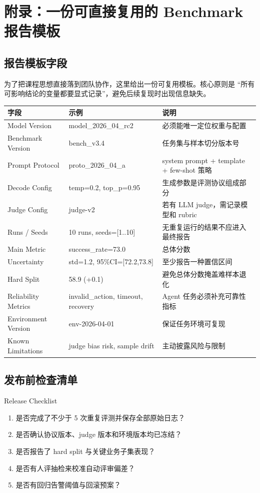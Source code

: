 \section{附录：一份可直接复用的 Benchmark 报告模板}

\subsection{报告模板字段}
为了把课程思想直接落到团队协作，这里给出一份可复用模板。核心原则是 ``所有可影响结论的变量都要显式记录''，避免后续复现时出现信息缺失。

\begin{longtable}{p{2.9cm}p{3.7cm}p{4.5cm}}
\toprule
\textbf{字段} & \textbf{示例} & \textbf{说明} \\
\midrule
Model Version & model\_2026\_04\_rc2 & 必须能唯一定位权重与配置 \\
Benchmark Version & bench\_v3.4 & 任务集与样本切分版本号 \\
Prompt Protocol & proto\_2026\_04\_a & system prompt + template + few-shot 策略 \\
Decode Config & temp=0.2, top\_p=0.95 & 生成参数是评测协议组成部分 \\
Judge Config & judge-v2 & 若有 LLM judge，需记录模型和 rubric \\
Runs / Seeds & 10 runs, seeds=[1..10] & 无重复运行的结果不应进入最终报告 \\
Main Metric & success\_rate=73.0 & 总体分数 \\
Uncertainty & std=1.2, 95\%CI=[72.2,73.8] & 至少报告一种置信区间 \\
Hard Split & 58.9 (+0.1) & 避免总体分数掩盖难样本退化 \\
Reliability Metrics & invalid\_action, timeout, recovery & Agent 任务必须补充可靠性指标 \\
Environment Version & env-2026-04-01 & 保证任务环境可复现 \\
Known Limitations & judge bias risk, sample drift & 主动披露风险与限制 \\
\bottomrule
\end{longtable}

\subsection{发布前检查清单}
\begin{importantbox}{Release Checklist}
\begin{enumerate}
    \item 是否完成了不少于 5 次重复评测并保存全部原始日志？
    \item 是否确认协议版本、judge 版本和环境版本均已冻结？
    \item 是否报告了 hard split 与关键业务子集表现？
    \item 是否有人评抽检来校准自动评审偏差？
    \item 是否有回归告警阈值与回滚预案？
\end{enumerate}
\end{importantbox}

